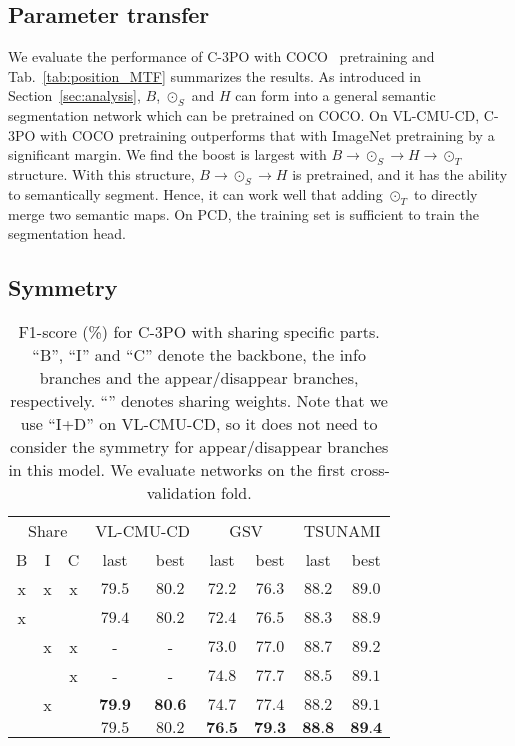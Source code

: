 \documentclass[review]{elsarticle}
\newcommand{\cmark}{\checkmark}\newcommand{\xmark}{\sffamily x}
\begin{document}
\subsection{Parameter transfer}
\label{sec:transfer}

We evaluate the performance of C-3PO with COCO~\cite{COCO} pretraining and Tab.~\ref{tab:position_MTF} summarizes the results. As introduced in Section~\ref{sec:analysis}, $B$, $\odot_{S}$ and $H$ can form into a general semantic segmentation network which can be pretrained on COCO. On VL-CMU-CD, C-3PO with COCO pretraining outperforms that with ImageNet pretraining by a significant margin. We find the boost is largest with $B \rightarrow \odot_{S} \rightarrow H \rightarrow \odot_{T}$ structure. With this structure, $B \rightarrow \odot_{S} \rightarrow H$ is pretrained, and it has the ability to semantically segment. Hence, it can work well that adding $\odot_{T}$ to directly merge two semantic maps. On PCD, the training set is sufficient to train the segmentation head.  

\subsection{Symmetry}
\label{sec:symmetry}

\begin{table}
  \centering
  \small
  \caption{F1-score (\%) for C-3PO with sharing specific parts. ``B'', ``I'' and ``C'' denote the backbone, the info branches and the appear/disappear branches, respectively. ``\cmark'' denotes sharing weights. Note that we use ``I+D'' on VL-CMU-CD, so it does not need to consider the symmetry for appear/disappear branches in this model. We evaluate networks on the first cross-validation fold.}
  \begin{tabular}{ccccccccc}
    \hline
    \multicolumn{3}{c}{Share} & \multicolumn{2}{c}{VL-CMU-CD} & \multicolumn{2}{c}{GSV} & \multicolumn{2}{c}{TSUNAMI} \\
    B & I & C & last & best & last & best & last & best \\
    \hline
    \xmark & \xmark & \xmark & $79.5$ & $80.2$  & $72.2$ & $76.3$ & $88.2$ & $89.0$\\
    \xmark & \cmark & \cmark & $79.4$ & $80.2$  & $72.4$ & $76.5$ & $88.3$ & $88.9$\\
    \cmark & \xmark & \xmark & - & - & $73.0$ & $77.0$ & $88.7$ & $89.2$ \\
    \cmark & \cmark & \xmark & - & - & $74.8$ & $77.7$ & $88.5$ & $89.1$ \\
    \cmark & \xmark & \cmark & $\textbf{79.9}$ & $\textbf{80.6}$ & $74.7$ & $77.4$ & $88.2$ & $89.1$ \\
    \cmark & \cmark & \cmark & $79.5$ & $80.2$ & $\textbf{76.5}$ & $\textbf{79.3}$ & $\textbf{88.8}$ & $\textbf{89.4}$ \\
    \hline
  \end{tabular}
  \label{tab:symmetry}
\end{table}
\end{document}
